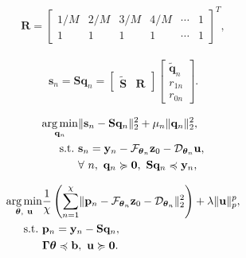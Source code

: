 \documentclass[]{article}
\DeclareMathOperator*{\argmin}{arg\,min}
\begin{document}
\begin{align} \label{fml:tonic-basis-2}
\mathbf{R} = \begin{bmatrix}
1/M & 2/M & 3/M & 4/M & \cdots & 1 \\
1 & 1 & 1 & 1 & \cdots & 1 
\end{bmatrix}^T,
\end{align}

\begin{align}
\mathbf{s}_n = \mathbf{S} \mathbf{q}_n = \begin{bmatrix}
\tilde{\mathbf{S}} & \mathbf{R}
\end{bmatrix} \begin{bmatrix}
\tilde{\mathbf{q}}_n \\ r_{1n} \\ r_{0n}
\end{bmatrix}.
\end{align}

\begin{subequations} \label{fml:the:second-tonic}
  \renewcommand{\theequation}
  {\theparentequation-\arabic{equation}}
  \begin{align}
  \argmin\limits_{\mathbf{q}_n} & \lVert \mathbf{s}_n - \mathbf{S} \mathbf{q}_n \rVert^2_2 + \mu_n \lVert \mathbf{q}_n \rVert_2^2, \\
  \mathrm{s.t.}~& \mathbf{s}_n = \mathbf{y}_n - \mathcal{F}_{\boldsymbol{\theta}_n} \mathbf{z}_{0} - \mathcal{D}_{\boldsymbol{\theta}_n} \mathbf{u}, \label{fml:the:second-tonic-obj}\\
  & \forall~n,~\mathbf{q}_n \succcurlyeq \mathbf{0},~\mathbf{S}\mathbf{q}_n \preccurlyeq \mathbf{y}_n,
  \end{align}
\end{subequations}

\begin{subequations} \label{fml:the:second-phasic}
  \renewcommand{\theequation}
  {\theparentequation-\arabic{equation}}
  \begin{align}
  \argmin\limits_{\boldsymbol{\theta},~\mathbf{u}} & \frac{1}{\chi}  \left( \sum_{n=1}^{\chi} \lVert \mathbf{p}_n - \mathcal{F}_{\boldsymbol{\theta}_n} \mathbf{z}_{0} - \mathcal{D}_{\boldsymbol{\theta}_n} \rVert^2_2 \right) + \lambda \lVert \mathbf{u} \rVert_p^p, \\
  \mathrm{s.t.}~& \mathbf{p}_n = \mathbf{y}_n -  \mathbf{S} \mathbf{q}_n, \\
  & \boldsymbol{\Gamma} \boldsymbol{\theta} \preccurlyeq \mathbf{b},~ \mathbf{u} \succcurlyeq \mathbf{0}.
  \end{align}
\end{subequations}



\end{document}
